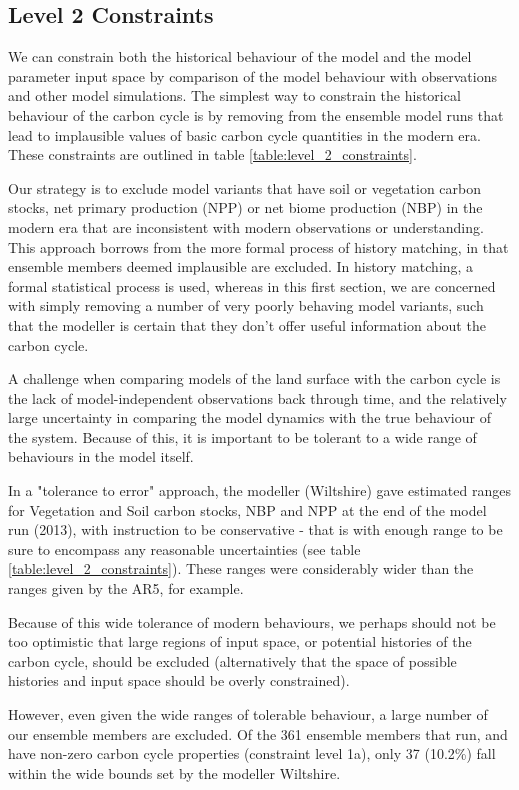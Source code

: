 \documentclass[gmd, manuscript]{copernicus}
\begin{document}
\subsection{Level 2 Constraints}

We can constrain both the historical behaviour of the model and the model parameter input space by comparison of the model behaviour with observations and other model simulations.
The simplest way to constrain the historical behaviour of the carbon cycle is by removing from the ensemble model runs that lead to implausible values of basic carbon cycle quantities in the modern era. These constraints are outlined in table \ref{table:level_2_constraints}.

Our strategy is to exclude model variants that have soil or vegetation carbon stocks, net primary production (NPP) or net biome production (NBP) in the modern era that are inconsistent with modern observations or understanding. This approach borrows from the more formal process of history matching, in that ensemble members deemed implausible are excluded. In history matching, a formal statistical process is used, whereas in this first section, we are concerned with simply removing a number of very poorly behaving model variants, such that the modeller is certain that they don't offer useful information about the carbon cycle.

A challenge when comparing models of the land surface with the carbon cycle is the lack of model-independent observations back through time, and the relatively large uncertainty in comparing the model dynamics with the true behaviour of the system. Because of this, it is important to be tolerant to a wide range of behaviours in the model itself. 

In a "tolerance to error" approach, the modeller (Wiltshire) gave estimated ranges for Vegetation and Soil carbon stocks, NBP and NPP at the end of the model run (2013), with instruction to be conservative - that is with enough range to be sure to encompass any reasonable uncertainties (see table \ref{table:level_2_constraints}). These ranges were considerably wider than the ranges given by the AR5, for example.

Because of this wide tolerance of modern behaviours, we perhaps should not be too optimistic that large regions of input space, or potential histories of the carbon cycle, should be excluded (alternatively that the space of possible histories and input space should be overly constrained).

However, even given the wide ranges of tolerable behaviour, a large number of our ensemble members are excluded. Of the 361 ensemble members that run, and have non-zero carbon cycle properties (constraint level 1a), only 37 (10.2\%) fall within the wide bounds set by the modeller Wiltshire.
\end{document}
